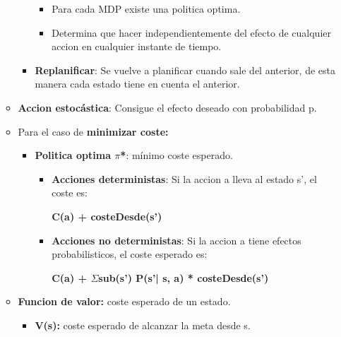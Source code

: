 \documentclass[12pt, twoside, openright]{report} %
\begin{document}
\begin{itemize}
\begin{itemize}
\begin{itemize}
\begin{itemize}
        \item Para cada MDP existe una politica optima.
          
        \item Determina que hacer independientemente del efecto de cualquier
          accion en cualquier instante de tiempo.
          
        \end{itemize}
      \item \textbf{Replanificar}: Se vuelve a planificar cuando sale del
        anterior, de esta manera cada estado tiene en cuenta el
        anterior.
        
      \end{itemize}
    \item \textbf{Accion estocástica}: Consigue el efecto deseado con
      probabilidad p.
      
    \item Para el caso de \textbf{minimizar coste:}
      

      \begin{itemize}
      \item \textbf{Politica optima $\pi$*}: mínimo coste esperado.
        

        \begin{itemize}
        \item \textbf{Acciones deterministas}: Si la accion a lleva al
          estado s', el coste es:
          

         
		  
            \textbf{C(a) + costeDesde(s')}
          
			
        \item \textbf{Acciones no deterministas}: Si la accion a tiene
          efectos probabilisticos, el coste esperado es:
          

          
		  
            \textbf{C(a) + $\Sigma$sub(s') P(s'|{} s, a) *
            costeDesde(s')}
          
			
        \end{itemize}
      \end{itemize}
    \item \textbf{Funcion de valor:} coste esperado de un estado.
      

      \begin{itemize}
      \item \textbf{V(s):} coste esperado de alcanzar la meta desde s.
        

\end{itemize}
\end{itemize}
\end{itemize}
\end{document}
